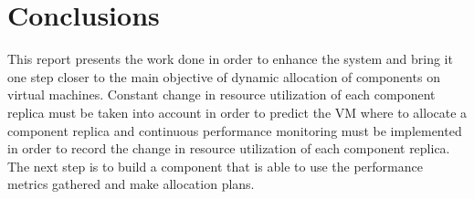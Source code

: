 \section*{Conclusions}
This report presents the work done in order to enhance the system and bring it one step closer to the main objective of dynamic allocation of components on virtual machines. Constant change in resource utilization of each component replica must be taken into account in order to predict the VM where to allocate a component replica and continuous performance monitoring must be implemented in order to record the change in resource utilization of each component replica. The next step is to build a component that is able to use the performance metrics gathered and make allocation plans.